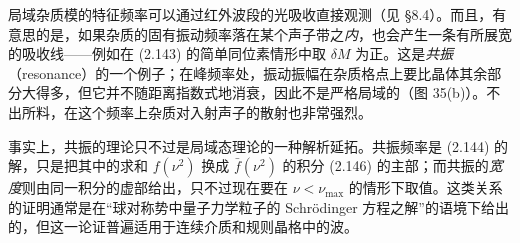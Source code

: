 局域杂质模的特征频率可以通过红外波段的光吸收直接观测（见 §8.4）。而且，有意思的是，如果杂质的固有振动频率落在某个声子带之\emph{内}，也会产生一条有所展宽的吸收线——例如在 (2.143) 的简单同位素情形中取 $\delta M$ 为正。这是\emph{共振}（resonance）的一个例子；在峰频率处，振动振幅在杂质格点上要比晶体其余部分大得多，但它并不随距离指数式地消衰，因此不是严格局域的（图 35(b)）。不出所料，在这个频率上杂质对入射声子的散射也非常强烈。

事实上，共振的理论只不过是局域态理论的一种解析延拓。共振频率是 (2.144) 的解，只是把其中的求和 $f(\nu^2)$ 换成 $\bar{f}(\nu^2)$ 的积分 (2.146) 的主部；而共振的\emph{宽度}则由同一积分的虚部给出，只不过现在要在 $\nu<\nu_{\max}$ 的情形下取值。这类关系的证明通常是在“球对称势中量子力学粒子的 Schrödinger 方程之解”的语境下给出的，但这一论证普遍适用于连续介质和规则晶格中的波。
